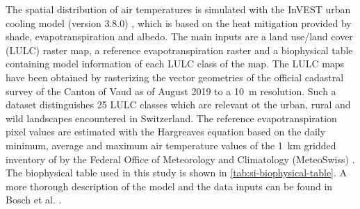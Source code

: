 \documentclass[10pt,letterpaper]{article}
\begin{document}
The spatial distribution of air temperatures is simulated with the InVEST urban cooling model (version 3.8.0) \cite{sharp2020invest}, which is based on the heat mitigation provided by shade, evapotranspiration and albedo.
The main inputs are a land use/land cover (LULC) raster map, a reference evapotranspiration raster and a biophysical table containing model information of each LULC class of the map.
The LULC maps have been obtained by rasterizing the vector geometries of the official cadastral survey of the Canton of Vaud \cite{asitvd2018structure} as of August 2019 to a 10~m resolution. Such a dataset distinguishes 25 LULC classes which are relevant ot the urban, rural and wild landscapes encountered in Switzerland.
The reference evapotranspiration pixel values are estimated with the Hargreaves equation \cite{hargreaves1985reference} based on the daily minimum, average and maximum air temperature values of the 1~km gridded inventory of by the Federal Office of Meteorology and Climatology (MeteoSwiss) \cite{frei2014interpolation}.
The biophysical table used in this study is shown in \autoref{tab:si-biophysical-table}.
A more thorough description of the model and the data inputs can be found in Bosch et al. \cite{bosch2020spatially}.
\end{document}
